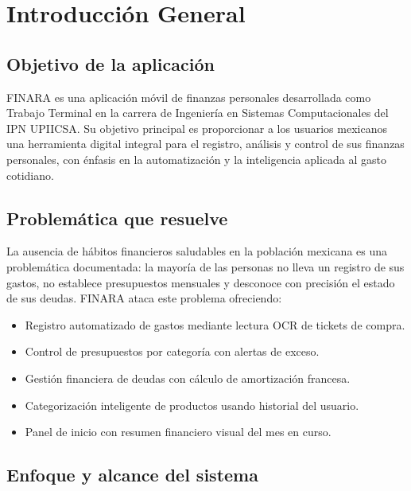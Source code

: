 \documentclass[12pt, letterpaper]{article}
\begin{document}
\tableofcontents
\newpage


\section{Introducción General}

\subsection{Objetivo de la aplicación}

FINARA es una aplicación móvil de finanzas personales desarrollada como
Trabajo Terminal en la carrera de Ingeniería en Sistemas Computacionales del
IPN UPIICSA. Su objetivo principal es proporcionar a los usuarios mexicanos
una herramienta digital integral para el registro, análisis y control de sus
finanzas personales, con énfasis en la automatización y la inteligencia
aplicada al gasto cotidiano.

\subsection{Problemática que resuelve}

La ausencia de hábitos financieros saludables en la población mexicana es
una problemática documentada: la mayoría de las personas no lleva un registro
de sus gastos, no establece presupuestos mensuales y desconoce con precisión
el estado de sus deudas. FINARA ataca este problema ofreciendo:

\begin{itemize}
  \item Registro automatizado de gastos mediante lectura OCR de tickets de compra.
  \item Control de presupuestos por categoría con alertas de exceso.
  \item Gestión financiera de deudas con cálculo de amortización francesa.
  \item Categorización inteligente de productos usando historial del usuario.
  \item Panel de inicio con resumen financiero visual del mes en curso.
\end{itemize}

\subsection{Enfoque y alcance del sistema}
\end{document}
